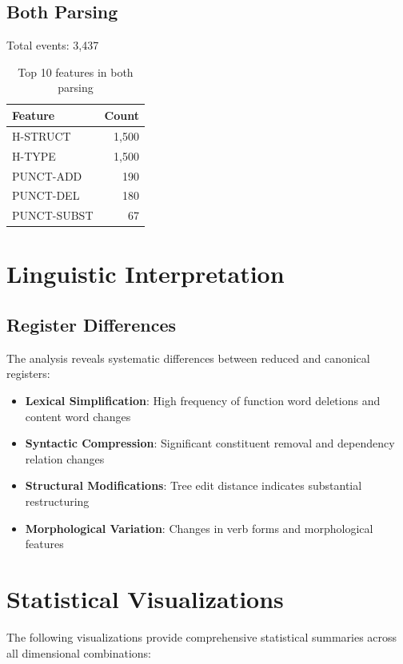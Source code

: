 \documentclass[11pt,a4paper]{article}
\begin{document}
\subsection{Both Parsing}

Total events: 3,437

\begin{table}[h]
\centering
\begin{tabular}{lr}
\toprule
Feature & Count \\
\midrule
H-STRUCT & 1,500 \\
H-TYPE & 1,500 \\
PUNCT-ADD & 190 \\
PUNCT-DEL & 180 \\
PUNCT-SUBST & 67 \\
\bottomrule
\end{tabular}
\caption{Top 10 features in both parsing}
\end{table}

\section{Linguistic Interpretation}

\subsection{Register Differences}

The analysis reveals systematic differences between reduced and canonical registers:

\begin{itemize}
\item \textbf{Lexical Simplification}: High frequency of function word deletions and content word changes
\item \textbf{Syntactic Compression}: Significant constituent removal and dependency relation changes
\item \textbf{Structural Modifications}: Tree edit distance indicates substantial restructuring
\item \textbf{Morphological Variation}: Changes in verb forms and morphological features
\end{itemize}

\section{Statistical Visualizations}

The following visualizations provide comprehensive statistical summaries across all dimensional combinations:
\end{document}
